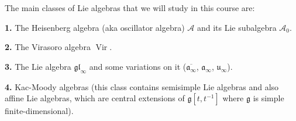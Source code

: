 \documentclass[etingof-lie.tex]{subfiles}
\begin{document}
The main classes of Lie algebras that we will study in this course are:

\textbf{1.} The Heisenberg algebra (aka oscillator algebra) $\mathcal{A}$ and
its Lie subalgebra $\mathcal{A}_{0}$.

\textbf{2.} The Virasoro algebra $\operatorname*{Vir}$.

\textbf{3.} The Lie algebra $\mathfrak{gl}_{\infty}$ and some variations on it
($\overline{\mathfrak{a}_{\infty}}$, $\mathfrak{a}_{\infty}$, $\mathfrak{u}%
_{\infty}$).

\textbf{4.} Kac-Moody algebras (this class contains semisimple Lie algebras
and also affine Lie algebras, which are central extensions of $\mathfrak{g}%
\left[  t,t^{-1}\right]  $ where $\mathfrak{g}$ is simple finite-dimensional).
\end{document}
